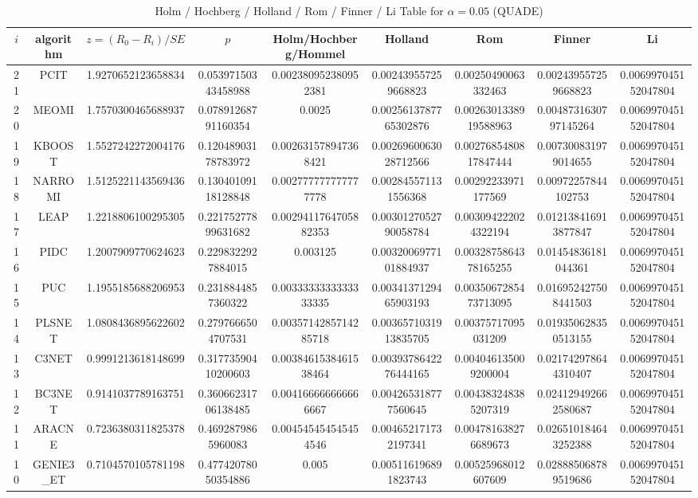 \documentclass[a4paper,10pt]{article}
\begin{document}
\begin{landscape}
\begin{table}[!htp]
\centering\scriptsize
\caption{Holm / Hochberg / Holland / Rom / Finner / Li Table for $\alpha=0.05$ (QUADE)}
\begin{tabular}{ccccccccc}
$i$&algorithm&$z=(R_0 - R_i)/SE$&$p$&Holm/Hochberg/Hommel&Holland&Rom&Finner&Li\\
\hline
21&PCIT&1.9270652123658834&0.05397150343458988&0.002380952380952381&0.002439557259668823&0.00250490063332463&0.002439557259668823&0.006997045152047804\\
20&MEOMI&1.7570300465688937&0.07891268791160354&0.0025&0.0025613787765302876&0.0026301338919588963&0.0048731630797145264&0.006997045152047804\\
19&KBOOST&1.5527242272004176&0.12048903178783972&0.002631578947368421&0.0026960063028712566&0.0027685480817847444&0.007300831979014655&0.006997045152047804\\
18&NARROMI&1.5125221143569436&0.13040109118128848&0.002777777777777778&0.002845571131556368&0.00292233971177569&0.00972257844102753&0.006997045152047804\\
17&LEAP&1.2218806100295305&0.22175277899631682&0.0029411764705882353&0.0030127052790058784&0.003094222024322194&0.012138416913877847&0.006997045152047804\\
16&PIDC&1.2007909770624623&0.2298322927884015&0.003125&0.0032006977101884937&0.0032875864378165255&0.01454836181044361&0.006997045152047804\\
15&PUC&1.1955185688206953&0.2318844857360322&0.0033333333333333335&0.0034137129465903193&0.0035067285473713095&0.016952427508441503&0.006997045152047804\\
14&PLSNET&1.0808436895622602&0.2797666504707531&0.0035714285714285718&0.0036571031913835705&0.00375717095031209&0.019350628350513155&0.006997045152047804\\
13&C3NET&0.9991213618148699&0.31773590410200603&0.0038461538461538464&0.0039378642276444165&0.004046135009200004&0.021742978644310407&0.006997045152047804\\
12&BC3NET&0.9141037789163751&0.36066231706138485&0.004166666666666667&0.004265318777560645&0.004383248385207319&0.024129492662580687&0.006997045152047804\\
11&ARACNE&0.7236380311825378&0.4692879865960083&0.004545454545454546&0.004652171732197341&0.004781638276689673&0.026510184643252388&0.006997045152047804\\
10&GENIE3_ET&0.7104570105781198&0.47742078050354886&0.005&0.005116196891823743&0.00525968012607609&0.028885068789519686&0.006997045152047804\\

\end{tabular}
\end{table}
\end{landscape}
\end{document}
